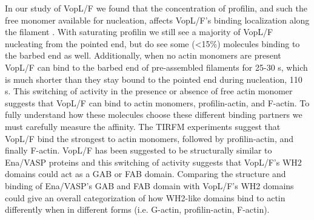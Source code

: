 In our study of VopL/F we found that the concentration of profilin, and such the free monomer available for nucleation, affects VopL/F's binding localization along the filament \citep{burke_bacterial_2017}. With saturating profilin we still see a majority of VopL/F nucleating from the pointed end, but do see some (<15\%) molecules binding to the barbed end as well. Additionally, when no actin monomers are present VopL/F can bind to the barbed end of pre-assembled filaments for 25-30 s, which is much shorter than they stay bound to the pointed end during nucleation, 110 s. This switching of activity in the presence or absence of free actin monomer suggests that VopL/F can bind to actin monomers, profilin-actin, and F-actin. To fully understand how these molecules choose these different binding partners we must carefully measure the affinity. The TIRFM experiments suggest that VopL/F bind the strongest to actin monomers, followed by profilin-actin, and finally F-actin. VopL/F has been suggested to be structurally similar to Ena/VASP proteins and this switching of activity suggests that VopL/F's WH2 domains could act as a GAB or FAB domain. Comparing the structure and binding of Ena/VASP's GAB and FAB domain with VopL/F's WH2 domains could give an overall categorization of how WH2-like domains bind to actin differently when in different forms (i.e. G-actin, profilin-actin, F-actin). 

